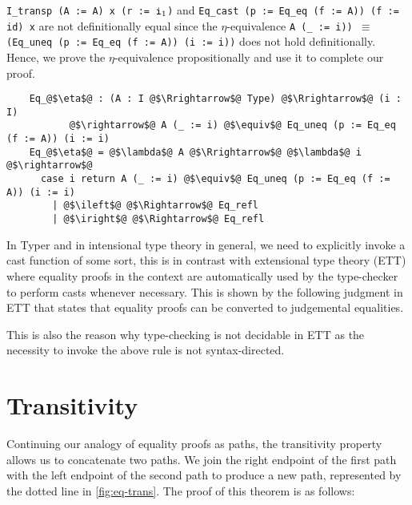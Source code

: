 \documentclass[12pt,twoside,maitrise]{dms}
\theoremstyle{definition}
\numberwithin{equation}{section}
\numberwithin{table}{chapter}
\numberwithin{figure}{chapter}
\newcommand\fn[1] {\texttt{#1}}
\begin{document}
\fn{I_transp (A := A) x (r := $\texttt{i}_1$)} and \fn{Eq_cast (p := Eq_eq (f := A)) (f :=
  id) x} are not definitionally equal since the $\eta$-equivalence \fn{A (_ :=
  i)) $\equiv$ (Eq_uneq (p := Eq_eq (f := A)) (i := i))} does not hold
definitionally. Hence, we prove the $\eta$-equivalence propositionally and use
it to complete our proof.

\begin{verbatim}
    Eq_@$\eta$@ : (A : I @$\Rrightarrow$@ Type) @$\Rrightarrow$@ (i : I)
           @$\rightarrow$@ A (_ := i) @$\equiv$@ Eq_uneq (p := Eq_eq (f := A)) (i := i)
    Eq_@$\eta$@ = @$\lambda$@ A @$\Rrightarrow$@ @$\lambda$@ i @$\rightarrow$@
      case i return A (_ := i) @$\equiv$@ Eq_uneq (p := Eq_eq (f := A)) (i := i)
        | @$\ileft$@ @$\Rightarrow$@ Eq_refl
        | @$\iright$@ @$\Rightarrow$@ Eq_refl
\end{verbatim}


In Typer and in intensional type theory in general, we need to explicitly invoke
a cast function of some sort, this is in contrast with extensional type theory
(ETT)\cite{martin1982constructive} where equality proofs in the context are
automatically used by the type-checker to perform casts whenever necessary. This
is shown by the following judgment in ETT that states that equality proofs can
be converted to judgemental equalities.

\begin{prooftree*}
\end{prooftree*}

This is also the reason why type-checking is not decidable in ETT as the
necessity to invoke the above rule is not syntax-directed.

\section{Transitivity}\label{sec:eqtransitivity}
Continuing our analogy of equality proofs as paths, the transitivity property
allows us to concatenate two paths. We join the right endpoint of the first path
with the left endpoint of the second path to produce a new path, represented by
the dotted line in \autoref{fig:eq-trans}. The proof of this theorem is as
follows:
\end{document}
